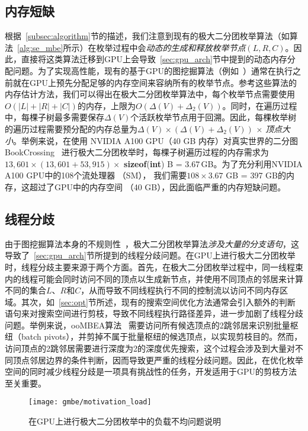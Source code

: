 \subsection{内存短缺}
根据~\ref{subsec:algorithm}节的描述，我们注意到现有的极大二分团枚举算法（如算法~\ref{alg:se_mbe}所示）在枚举过程中会\emph{动态的生成和释放枚举节点$(L,R,C)$}。因此，直接将这类算法迁移到GPU上会导致~\ref{sec:gpu_arch}节中提到的动态内存分配问题。为了实现高性能，现有的基于GPU的图挖掘算法（例如~\cite{MCE-GPU21,Kclique22,g2miner22,Graphset23}）通常在执行之前就在GPU上预先分配足够的内存空间来容纳所有的枚举节点。参考这些算法的内存估计方法，我们可以得出在极大二分团枚举算法中，每个枚举节点需要使用$O(|L|+|R|+|C|)$的内存，上限为$O(\Delta(V) + \Delta_2(V))$。同时，在遍历过程中，每棵子树最多需要保存$\Delta(V)$个活跃枚举节点用于回溯。因此，每棵枚举树的遍历过程需要预分配的内存总量为$\Delta(V) \times (\Delta(V) + \Delta_2(V))$ $\times$ \textit{顶点大小}。举例来说，在使用 NVIDIA A100 GPU（40 GB 内存）对真实世界的二分图 BookCrossing~\cite{konect} 进行极大二分团枚举时，每棵子树遍历过程的内存需求为$13,601 \times (13,601 + 53,915) \times$ \textbf{sizeof}(\textbf{int}) B = 3.67\,GB。为了充分利用NVIDIA A100 GPU中的108个流处理器 （SM）， 我们需要$108 \times 3.67$ GB = 397 GB的内存，这超过了GPU中的内存空间 （40 GB），因此面临严重的内存短缺问题。

\subsection{线程分歧}
\label{subsec:gmbe_thread_divergence}

由于图挖掘算法本身的不规则性~\cite{Irregularity12}，极大二分团枚举算法\emph{涉及大量的分支语句}，这导致了~\ref{sec:gpu_arch}节所提到的线程分歧问题。在GPU上进行极大二分团枚举时，线程分歧主要来源于两个方面。首先，在极大二分团枚举过程中，同一线程束内的线程可能会同时访问不同的顶点以生成新节点，并使用不同顶点的邻居来计算不同的集合$L$、$R$和$C$，从而导致不同线程执行不同的控制流以访问不同内存区域。其次，如~\ref{sec:opt}节所述，现有的搜索空间优化方法通常会引入额外的判断语句来对搜索空间进行剪枝，导致不同线程执行路径差异，进一步加剧了线程分歧问题。举例来说，ooMBEA算法~\cite{ooMBE22} 需要访问所有候选顶点的2跳邻居来识别批量枢纽（batch pivots），并剪掉不属于批量枢纽的候选顶点，以实现剪枝目的。然而，访问顶点的2跳邻居需要进行深度为2的深度优先搜索，这个过程会涉及到大量对不同顶点邻居边界的条件判断，因而导致更严重的线程分歧问题。因此，在优化枚举空间的同时减少线程分歧是一项具有挑战性的任务，开发适用于GPU的剪枝方法至关重要。

\begin{figure} [H]
  \center
    \vspace{0.1in}
		\texttt{[image: gmbe/motivation\_load]}
    \vspace{0.1in}
	\caption{在GPU上进行极大二分团枚举中的负载不均问题说明}
	\label{fig:gmbe_load_reason}
\end{figure}


